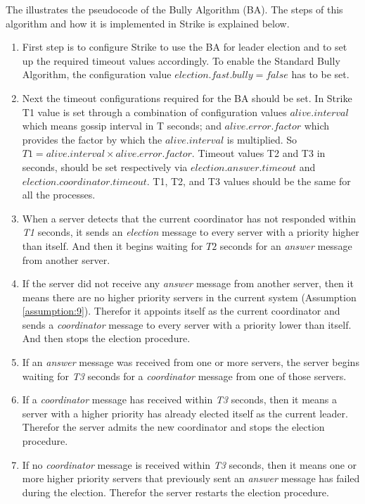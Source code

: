 \documentclass[dareport.tex]{subfiles}
\begin{document}
The  illustrates the pseudocode of the Bully Algorithm (BA). The steps of this algorithm and how it is implemented in Strike is explained below.
\begin{enumerate}[leftmargin=*]
	\item First step is to configure Strike to use the BA for leader election and to set up the required timeout values accordingly. To enable the Standard Bully Algorithm, the configuration value $election.fast.bully=false$ has to be set.
	\item Next the timeout configurations required for the BA should be set. In Strike T1 value is set through a combination of configuration values $ alive.interval $ which means gossip interval in T seconds; and $ alive.error.factor $ which provides the factor by which the $ alive.interval $ is multiplied. So $ T1= alive.interval \times alive.error.factor $. Timeout values T2 and T3 in seconds, should be set respectively via $ election.answer.timeout $ and $ election.coordinator.timeout $. T1, T2, and T3 values should be the same for all the processes.
	\item When a server detects that the current coordinator has not responded within \emph{T1} seconds, it sends an \emph{election} message to every server with a priority higher than itself. And then it begins waiting for $ T2 $ seconds for an \emph{answer} message from another server.
	\item If the server did not receive any \emph{answer} message from another server, then it means there are no higher priority servers in the current system (Assumption \ref{assumption:9}). Therefor it appoints itself as the current coordinator and sends a \emph{coordinator} message to every server with a priority lower than itself. And then stops the election procedure.
	\item If an \emph{answer} message was received from one or more servers, the server begins waiting for \emph{T3} seconds for a \emph{coordinator} message from one of those servers.
	\item If a \emph{coordinator} message has received within \emph{T3} seconds, then it means a server with a higher priority has already elected itself as the current leader. Therefor the server admits the new coordinator and stops the election procedure.
	\item If no \emph{coordinator} message is received within \emph{T3} seconds, then it means one or more higher priority servers that previously sent an \emph{answer} message has failed during the election. Therefor the server restarts the election procedure.

\end{enumerate}
\end{document}
